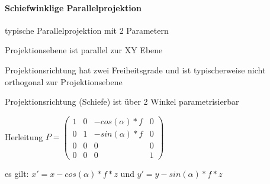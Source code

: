 \documentclass[landscape]{article}
\begin{document}
\begin{multicols}{3}
  \paragraph{Schiefwinklige Parallelprojektion}
  \begin{itemize*}
    \item typische Parallelprojektion mit 2 Parametern
    \item Projektionsebene ist parallel zur XY Ebene
    \item Projektionsrichtung hat zwei Freiheitsgrade und ist typischerweise nicht orthogonal zur Projektionsebene
    \item Projektionsrichtung (Schiefe) ist über 2 Winkel parametrisierbar
    \item Herleitung $P=\begin{pmatrix}
              1 & 0 & -cos(\alpha)*f & 0  \\
              0 & 1 & -sin(\alpha)*f & 0  \\
              0 & 0 & 0              & 0  \\
              0 & 0 & 0              & 1 
            \end{pmatrix}$
    \item es gilt: $x'=x-cos(\alpha)*f*z$ und $y'=y-sin(\alpha)*f*z$
  \end{itemize*}
  

\end{multicols}
\end{document}

